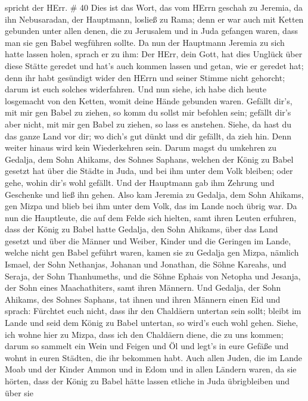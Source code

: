 spricht der HErr. \# 40  Dies ist das Wort, das vom HErrn
geschah zu Jeremia, da ihn Nebusaradan, der Hauptmann, losließ zu Rama;
denn er war auch mit Ketten gebunden unter allen denen, die zu Jerusalem
und in Juda gefangen waren, dass man sie gen Babel wegführen sollte.
 Da nun der Hauptmann Jeremia zu sich hatte lassen holen,
sprach er zu ihm: Der HErr, dein Gott, hat dies Unglück über diese
Stätte geredet  und hat's auch kommen lassen und getan, wie
er geredet hat; denn ihr habt gesündigt wider den HErrn und seiner
Stimme nicht gehorcht; darum ist euch solches widerfahren. 
Und nun siehe, ich habe dich heute losgemacht von den Ketten, womit
deine Hände gebunden waren. Gefällt dir's, mit mir gen Babel zu ziehen,
so komm du sollst mir befohlen sein; gefällt dir's aber nicht, mit mir
gen Babel zu ziehen, so lass es anstehen. Siehe, da hast du das ganze
Land vor dir; wo dich's gut dünkt und dir gefällt, da zieh hin.
 Denn weiter hinaus wird kein Wiederkehren sein. Darum magst
du umkehren zu Gedalja, dem Sohn Ahikams, des Sohnes Saphans, welchen
der König zu Babel gesetzt hat über die Städte in Juda, und bei ihm
unter dem Volk bleiben; oder gehe, wohin dir's wohl gefällt. Und der
Hauptmann gab ihm Zehrung und Geschenke und ließ ihn gehen. 
Also kam Jeremia zu Gedalja, dem Sohn Ahikams, gen Mizpa und blieb bei
ihm unter dem Volk, das im Lande noch übrig war.  Da nun die
Hauptleute, die auf dem Felde sich hielten, samt ihren Leuten erfuhren,
dass der König zu Babel hatte Gedalja, den Sohn Ahikams, über das Land
gesetzt und über die Männer und Weiber, Kinder und die Geringen im
Lande, welche nicht gen Babel geführt waren,  kamen sie zu
Gedalja gen Mizpa, nämlich Ismael, der Sohn Nethanjas, Johanan und
Jonathan, die Söhne Kareahs, und Seraja, der Sohn Thanhumeths, und die
Söhne Ephais von Netopha und Jesanja, der Sohn eines Maachathiters, samt
ihren Männern.  Und Gedalja, der Sohn Ahikams, des Sohnes
Saphans, tat ihnen und ihren Männern einen Eid und sprach: Fürchtet euch
nicht, dass ihr den Chaldäern untertan sein sollt; bleibt im Lande und
seid dem König zu Babel untertan, so wird's euch wohl gehen.
 Siehe, ich wohne hier zu Mizpa, dass ich den Chaldäern
diene, die zu uns kommen; darum so sammelt ein Wein und Feigen und Öl
und legt's in eure Gefäße und wohnt in euren Städten, die ihr bekommen
habt.  Auch allen Juden, die im Lande Moab und der Kinder
Ammon und in Edom und in allen Ländern waren, da sie hörten, dass der
König zu Babel hätte lassen etliche in Juda übrigbleiben und über sie
